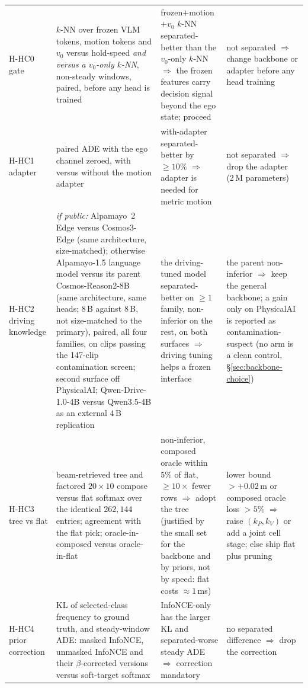 \begin{longtable}{@{}p{1.3cm}p{3.8cm}p{5.3cm}p{4.9cm}@{}}
H-HC0 gate & $k$-NN over frozen VLM tokens, motion tokens and $v_0$ versus hold-speed \emph{and versus a $v_0$-only $k$-NN}, non-steady windows, paired, before any head is trained & frozen$+$motion$+v_0$ $k$-NN separated-better than the $v_0$-only $k$-NN $\Rightarrow$ the frozen features carry decision signal beyond the ego state; proceed & not separated $\Rightarrow$ change backbone or adapter before any head training \\
H-HC1 adapter & paired ADE with the ego channel zeroed, with versus without the motion adapter & with-adapter separated-better by $\ge10\%$ $\Rightarrow$ adapter is needed for metric motion & not separated $\Rightarrow$ drop the adapter (2\,M parameters) \\
H-HC2 driving knowledge & \emph{if public:} Alpamayo~2 Edge versus Cosmos3-Edge (same architecture, size-matched); otherwise Alpamayo-1.5 language model versus its parent Cosmos-Reason2-8B (same architecture, same heads; $8$\,B against $8$\,B, not size-matched to the primary), paired, all four families, on clips passing the 147-clip contamination screen; second surface off PhysicalAI; Qwen-Drive-1.0-4B versus Qwen3.5-4B as an external $4$\,B replication & the driving-tuned model separated-better on $\ge1$ family, non-inferior on the rest, on both surfaces $\Rightarrow$ driving tuning helps a frozen interface & the parent non-inferior $\Rightarrow$ keep the general backbone; a gain only on PhysicalAI is reported as contamination-suspect (no arm is a clean control, \S\ref{sec:backbone-choice}) \\
H-HC3 tree vs flat & beam-retrieved tree and factored $20\times10$ compose versus flat softmax over the identical $262{,}144$ entries; agreement with the flat pick; oracle-in-composed versus oracle-in-flat & non-inferior, composed oracle within $5\%$ of flat, $\ge10\times$ fewer rows $\Rightarrow$ adopt the tree (justified by the small set for the backbone and by priors, not by speed: flat costs $\approx1$\,ms) & lower bound $>+0.02$\,m or composed oracle loss $>5\%$ $\Rightarrow$ raise $(k_P,k_V)$ or add a joint cell stage; else ship flat plus pruning \\
H-HC4 prior correction & KL of selected-class frequency to ground truth, and steady-window ADE: masked InfoNCE, unmasked InfoNCE and their $\beta$-corrected versions versus soft-target softmax & InfoNCE-only has the larger KL and separated-worse steady ADE $\Rightarrow$ correction mandatory & no separated difference $\Rightarrow$ drop the correction \\

\end{longtable}
